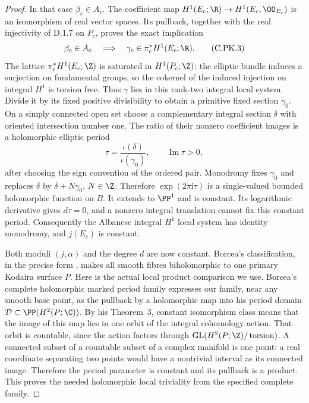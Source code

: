 \begin{proof}
In that case $\beta_c\in A_c$. The coefficient map
$H^1(E_c;\R)\to H^1(E_c,\OO_{E_c})$ is an isomorphism
of real vector spaces. Its pullback, together with the real
injectivity of D.1.7 on $P_c$, proves the exact implication
\[
 \beta_c\in A_c
 \quad\Longrightarrow\quad
 \gamma_c\in\pi_c^*H^1(E_c;\R).
\tag{C.PK.3}
\]
The lattice $\pi_c^*H^1(E_c;\Z)$ is saturated in
$H^1(P_c;\Z)$: the elliptic bundle induces a surjection
on fundamental groups, so the cokernel of the induced
injection on integral $H^1$ is torsion free. Thus $\gamma$
lies in this rank-two integral local system. Divide it by
its fixed positive divisibility to obtain a primitive fixed
section $\gamma_0$. On a simply connected open set choose
a complementary integral section $\delta$ with oriented
intersection number one. The ratio of their nonzero
coefficient images is a holomorphic elliptic period
\[
 \tau=\frac{\iota(\delta)}{\iota(\gamma_0)},
 \qquad \operatorname{Im}\tau>0,
\]
after choosing the sign convention of the ordered pair.
Monodromy fixes $\gamma_0$ and replaces $\delta$ by
$\delta+N\gamma_0$, $N\in\Z$. Therefore
$\exp(2\pi\mathrm i\tau)$ is a single-valued bounded
holomorphic function on $B$. It extends to $\PP^1$ and
is constant. Its logarithmic derivative gives $d\tau=0$,
and a nonzero integral translation cannot fix this constant
period. Consequently the Albanese integral $H^1$ local
system has identity monodromy, and $j(E_c)$ is constant.

Both moduli $(j,\alpha)$ and the degree $d$ are now
constant. Borcea's classification, in the precise form
\cite[\S1]{SS2002}, makes all smooth fibres biholomorphic
to one primary Kodaira surface $P$. Here is the actual
local product comparison we use. Borcea's complete
holomorphic marked period family \cite[Remark~1]{Borcea1984}
expresses our family, near any smooth base point, as the
pullback by a holomorphic map into his period domain
$\mathcal D\subset\PP(H^2(P;\C))$. By his Theorem~3,
constant isomorphism class means that the image of this
map lies in one orbit of the integral cohomology action.
That orbit is countable, since the action factors through
$\operatorname{GL}(H^2(P;\Z)/\operatorname{torsion})$.
A connected subset of a countable subset of a complex
manifold is one point: a real coordinate separating two
points would have a nontrivial interval as its connected
image. Therefore the period parameter is constant and
its pullback is a product. This proves the needed
holomorphic local triviality from the specified complete
family.


\end{proof}
